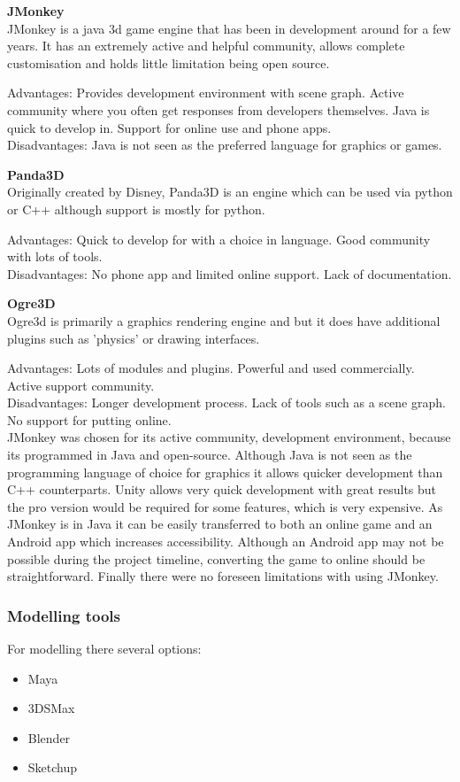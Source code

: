 \documentclass[11pt]{report}
\begin{document}
\textbf{JMonkey}\\
JMonkey is a java 3d game engine that has been in development around for a few years. It has an extremely active and helpful community, allows complete customisation and holds little limitation being open source.

Advantages: Provides development environment with scene graph. Active community where you often get responses from developers themselves. Java is quick to develop in. Support for online use and phone apps. \\
Disadvantages: Java is not seen as the preferred language for graphics or games.

\textbf{Panda3D}\\
Originally created by Disney, Panda3D is an engine which can be used via python or C++ although support is mostly for python.

Advantages: Quick to develop for with a choice in language. Good community with lots of tools.\\
Disadvantages: No phone app and limited online support. Lack of documentation. 

\textbf{Ogre3D}\\
Ogre3d is primarily a graphics rendering engine and but it does have additional plugins such as 'physics' or drawing interfaces.

Advantages: Lots of modules and plugins. Powerful and used commercially. Active support community.\\
Disadvantages: Longer development process. Lack of tools such as a scene graph. No support for putting online.\\

JMonkey was chosen for its active community, development environment, because its programmed in Java and open-source. Although Java is not seen as the programming language of choice for graphics it allows quicker development than C++ counterparts. Unity allows very quick development with great results but the pro version would be required for some features, which is very expensive. As JMonkey is in Java it can be easily transferred to both an online game and an Android app which increases accessibility. Although an Android app may not be possible during the project timeline, converting the game to online should be straightforward. Finally there were no foreseen limitations with using JMonkey.

\subsubsection{Modelling tools}
For modelling there several options:
\begin{itemize}
\item Maya
\item 3DSMax
\item Blender
\item Sketchup
\end{itemize}
\end{document}
